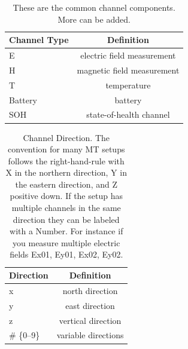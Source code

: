 \documentclass[12pt]{article}
\begin{document}
\begin{table}[h!]
	\centering
	\caption[Channel Components]{These are the common channel components.  More can be added.}
	\begin{tabular}{lc}
		\toprule
		\textbf{Channel Type} & \textbf{Definition} \\ \midrule
		E & electric field measurement  \\ \midrule	
		H & magnetic field measurement \\ \midrule
		T & temperature \\ \midrule
		Battery & battery   \\ \midrule
		SOH & state-of-health channel   \\ \bottomrule		
	\end{tabular}
	\label{tab:channel_types}
\end{table}

\begin{table}[h!]
	\centering
	\caption[Channel Direction]{Channel Direction.  The convention for many MT setups follows the right-hand-rule with X in the northern direction, Y in the eastern direction, and Z positive down.  If the setup has multiple channels in the same direction they can be labeled with a Number.  For instance if you measure multiple electric fields Ex01, Ey01, Ex02, Ey02.}
	\begin{tabular}{lc}
		\toprule
		\textbf{Direction} & \textbf{Definition} \\ \midrule
		x & north direction  \\ \midrule	
		y & east direction \\ \midrule
		z & vertical direction \\ \midrule
		\# \{0--9\} & variable directions   \\ \bottomrule		
	\end{tabular}
	\label{tab:diretions}
\end{table}
\end{document}
